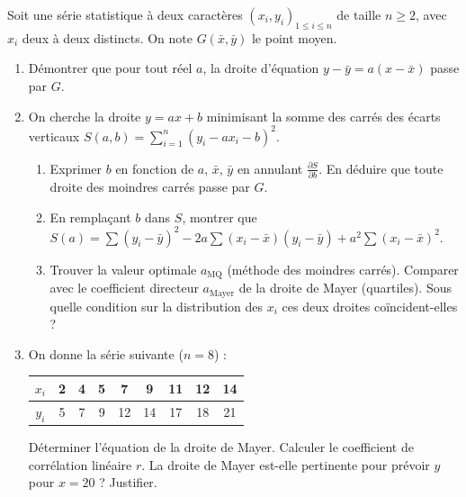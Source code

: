 \documentclass[11pt]{article}
\begin{document}
\begin{exercice}
Soit une série statistique à deux caractères $(x_i, y_i)_{1 \le i \le n}$ de taille $n \ge 2$, avec $x_i$ deux à deux distincts. On note $G(\bar{x}, \bar{y})$ le point moyen.
\begin{enumerate}
    \item Démontrer que pour tout réel $a$, la droite d'équation $y - \bar{y} = a(x - \bar{x})$ passe par $G$.
    \item On cherche la droite $y = ax + b$ minimisant la somme des carrés des écarts verticaux $S(a,b) = \sum_{i=1}^n (y_i - ax_i - b)^2$.
    \begin{enumerate}
        \item Exprimer $b$ en fonction de $a$, $\bar{x}$, $\bar{y}$ en annulant $\frac{\partial S}{\partial b}$. En déduire que toute droite des moindres carrés passe par $G$.
        \item En remplaçant $b$ dans $S$, montrer que $S(a) = \sum (y_i - \bar{y})^2 - 2a\sum (x_i - \bar{x})(y_i - \bar{y}) + a^2\sum (x_i - \bar{x})^2$.
        \item Trouver la valeur optimale $a_{\text{MQ}}$ (méthode des moindres carrés). Comparer avec le coefficient directeur $a_{\text{Mayer}}$ de la droite de Mayer (quartiles). Sous quelle condition sur la distribution des $x_i$ ces deux droites coïncident-elles ?
    \end{enumerate}
    \item On donne la série suivante ($n=8$) :
    \begin{center}
    \begin{tabular}{|c|c|c|c|c|c|c|c|c|}
    \hline
    $x_i$ & 2 & 4 & 5 & 7 & 9 & 11 & 12 & 14 \\
    \hline
    $y_i$ & 5 & 7 & 9 & 12 & 14 & 17 & 18 & 21 \\
    \hline
    \end{tabular}
    \end{center}
    Déterminer l'équation de la droite de Mayer. Calculer le coefficient de corrélation linéaire $r$. La droite de Mayer est-elle pertinente pour prévoir $y$ pour $x=20$ ? Justifier.
\end{enumerate}
\end{exercice}
\end{document}
